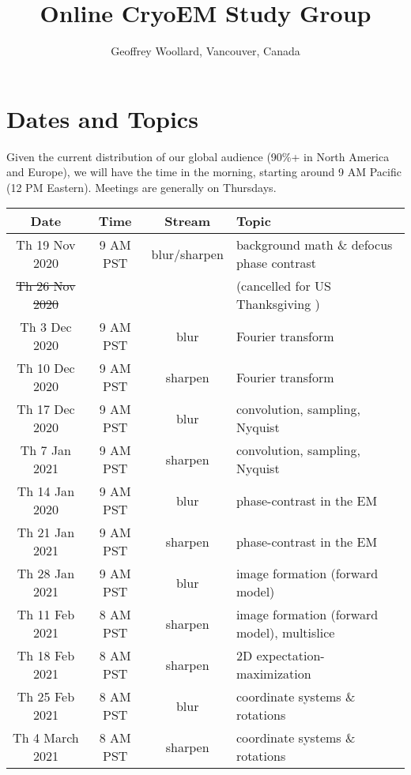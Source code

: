 \documentclass[11pt, oneside]{article}   	%
\title{Online CryoEM Study Group}
\author{Geoffrey Woollard, Vancouver, Canada}
\begin{document}
\maketitle

\tableofcontents



\pagebreak
\section{Dates and Topics}
Given the current distribution of our global audience (90\%+  in North America and Europe), we will have the time in the morning, starting around 9 AM Pacific (12 PM Eastern). Meetings are generally on Thursdays.

\begin{center}
\small
 \begin{tabular}{|| c c c p{90mm} ||} 
 \hline
 Date & Time & Stream & Topic \\ [0.5ex] 
 \hline\hline
Th 19 Nov 2020 & \tiny{9 AM PST} &  blur/sharpen & background math \& defocus phase contrast  \\ 
 \hline
\sout{Th 26 Nov 2020}  &   & & (cancelled for US Thanksgiving )    \\ 
 \hline
Th 3 Dec 2020 & \tiny{9 AM PST} & blur & Fourier transform   \\ 
 \hline
Th 10 Dec 2020 & \tiny{9 AM PST} & sharpen & Fourier transform   \\ 
 \hline
Th 17 Dec 2020 & \tiny{9 AM PST} & blur & convolution, sampling, Nyquist   \\ 
 \hline
Th 7 Jan 2021 & \tiny{9 AM PST} & sharpen & convolution, sampling, Nyquist   \\ 
 \hline
Th 14 Jan 2020 & \tiny{9 AM PST} & blur & phase-contrast in the EM   \\ 
 \hline
Th 21 Jan 2021 & \tiny{9 AM PST} & sharpen & phase-contrast in the EM   \\ 
 \hline
Th 28 Jan 2021 & \tiny{9 AM PST} & blur & image formation (forward model)   \\ 
 \hline
Th 11 Feb 2021 & \tiny{8 AM PST} & sharpen & image formation (forward model), multislice   \\ 
 \hline
Th 18 Feb 2021 & \tiny{8 AM PST} & sharpen &  2D expectation-maximization \\ 
 \hline
Th 25 Feb 2021 & \tiny{8 AM PST} & blur & coordinate systems \& rotations  \\ 
 \hline
 Th 4 March 2021 & \tiny{8 AM PST} & sharpen & coordinate systems \& rotations  \\ 

\end{tabular}
\end{center}
\end{document}
